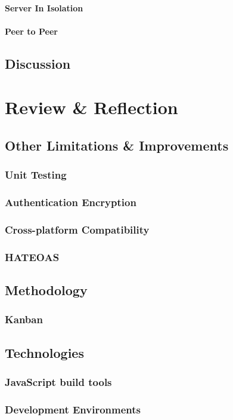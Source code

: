 \documentclass[]{report}
\begin{document}
				\subsubsection{Server In Isolation}
				\subsubsection{Peer to Peer}
		\section{Discussion}
	\chapter{Review \& Reflection}		
		\section{Other Limitations \& Improvements}
			\subsection{Unit Testing}
			\subsection{Authentication Encryption}
			\subsection{Cross-platform Compatibility}
			\subsection{HATEOAS}
		\section{Methodology}
			\subsection{Kanban}
		\section{Technologies}
			\subsection{JavaScript build tools}
			\subsection{Development Environments}
\end{document}

